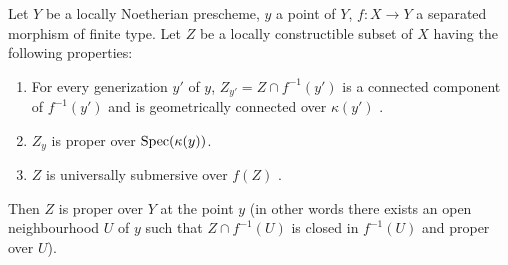 \begin{proposition}[15.7.9]
\label{IV.15.7.9}
Let $Y$ be a locally Noetherian prescheme, $y$ a point of $Y$, $f:X\to Y$ a separated morphism of finite type.
Let $Z$ be a locally constructible subset of $X$ having the following properties:
\begin{enumerate}[label=(\roman*)]
  \item For every generization $y'$ of $y$, $Z_{y'}=Z\cap f^{-1}(y')$ is a connected component of $f^{-1}(y')$ and is geometrically connected over $\kappa(y')$ .
  \item $Z_y$ is proper over $\operatorname{Spec}(\kappa(y))$.
  \item $Z$ is universally submersive over $f(Z)$ .
\end{enumerate}
Then $Z$ is proper over $Y$ at the point $y$ (in other words  there exists an open neighbourhood $U$ of $y$ such that $Z\cap f^{-1}(U)$ is closed in $f^{-1}(U)$ and proper over $U$).
\end{proposition}

